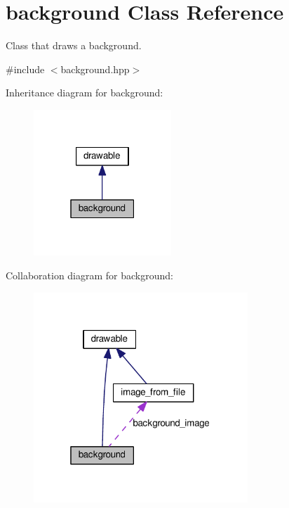 \hypertarget{classbackground}{}\section{background Class Reference}
\label{classbackground}


Class that draws a background.  




{\ttfamily \#include $<$background.\+hpp$>$}



Inheritance diagram for background\+:\nopagebreak
\begin{figure}[H]
\begin{center}
\leavevmode
\includegraphics[width=147pt]{classbackground__inherit__graph}
\end{center}
\end{figure}


Collaboration diagram for background\+:\nopagebreak
\begin{figure}[H]
\begin{center}
\leavevmode
\includegraphics[width=229pt]{classbackground__coll__graph}
\end{center}
\end{figure}

